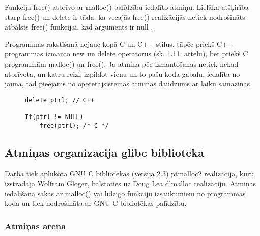 Funkcija free() atbrīvo ar malloc() palīdzību iedalīto atmiņu.
Lielāka atšķirība starp free() un delete ir tāda, ka vecajās free() realizācijās netiek nodrošināts atbalsts free() funkcijai, kad arguments ir null \cite{POCF}. 

Programmas rakstīšanā nejauc kopā C un C++ stilus, tāpēc priekš C++ programmas izmanto 
new un delete operatorus (sk. 1.11. attēlu), bet priekš C programmām malloc() un free().
Ja atmiņa pēc izmantošanas netiek nekad atbrīvota, un katru reizi, izpildot vienu un to pašu koda gabalu, iedalīta no jauna, tad pieejams no operētājsistēmas atmiņas daudzums ar laiku samazinās.

\begin{figure}[h]
\begin{lstlisting}
delete ptrl; // C++

If(ptrl != NULL)
	free(ptrl); /* C */
\end{lstlisting}
\caption{\textbf{\fontsize{11}{12}\selectfont {Dinamiskās atmiņas atbrīvošana C un C++}}}
\end{figure}




\subsection{Atmiņas organizācija glibc bibliotēkā}
Darbā tiek aplūkota GNU C bibliotēkas (versija 2.3) ptmalloc2 realizācija, kuru izstrādāja Wolfram Gloger, balstoties uz Doug Lea dlmalloc realizāciju. 
Atmiņas iedalīšana sākas ar malloc() vai līdzīgo funkciju izsaukumiem no programmas koda un tiek nodrošināta ar GNU C bibliotēkas palīdzību. 


\subsubsection{Atmiņas arēna}


